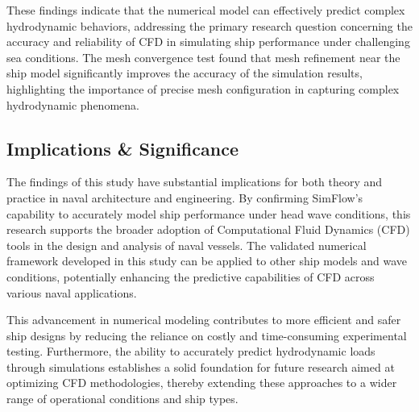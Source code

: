 \documentclass[12pt]{article} %
\begin{document}
These findings indicate that the numerical model can effectively predict complex hydrodynamic behaviors, addressing the primary research question 
concerning the accuracy and reliability of CFD in simulating ship performance under challenging sea conditions.
The mesh convergence test found that mesh refinement near the ship model significantly improves the accuracy of the simulation results, highlighting the importance of precise mesh configuration in capturing complex hydrodynamic phenomena.

\subsection{Implications \& Significance}
The findings of this study have substantial implications for both theory and practice in naval architecture and engineering. By confirming SimFlow's capability to accurately model ship performance under head wave conditions, this research supports the broader adoption of Computational Fluid Dynamics (CFD) tools in the design and analysis of naval vessels. The validated numerical framework developed in this study can be applied to other ship models and wave conditions, potentially enhancing the predictive capabilities of CFD across various naval applications.

This advancement in numerical modeling contributes to more efficient and safer ship designs by reducing the reliance on costly and time-consuming experimental testing. Furthermore, the ability to accurately predict hydrodynamic loads through simulations establishes a solid foundation for future research aimed at optimizing CFD methodologies, thereby extending these approaches to a wider range of operational conditions and ship types.
\end{document}

